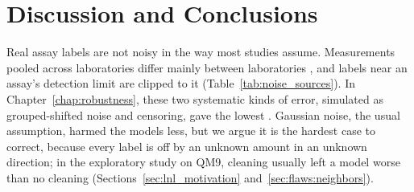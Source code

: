 \chapter{Discussion and Conclusions}\label{chap:discussion}

Real assay labels are not noisy in the way most studies assume. Measurements pooled across laboratories differ mainly between laboratories \citep{Bentz2013}, and labels near an assay's detection limit are clipped to it \citep{Svensson2025} (Table~\ref{tab:noise_sources}). In Chapter~\ref{chap:robustness}, these two systematic kinds of error, simulated as grouped-shifted noise and censoring, gave the lowest \aucnorm{}. Gaussian noise, the usual assumption, harmed the models less, but we argue it is the hardest case to correct, because every label is off by an unknown amount in an unknown direction; in the exploratory study on QM9, cleaning usually left a model worse than no cleaning (Sections~\ref{sec:lnl_motivation} and~\ref{sec:flaws:neighbors}).

